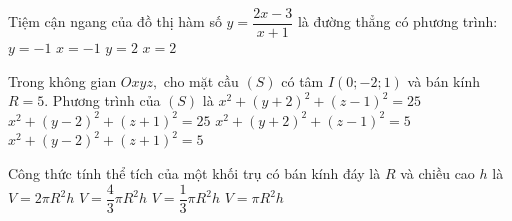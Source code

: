 \begin{ex}%
	Tiệm cận ngang của đồ thị hàm số $y=\dfrac{2x-3}{x+1}$ là đường thẳng có phương trình:
	\choice
	{$y=-1$}
	{$x=-1$}
	{\True $y=2$}
	{$x=2$}
\end{ex}

\begin{ex}%
	Trong không gian $Oxyz,$ cho mặt cầu $(S)$ có tâm $I\left(0;-2;1\right)$ và bán kính $R=5$. Phương trình của $(S)$ là
	\choice
	{\True $x^2+\left(y+2\right)^2+\left(z-1\right)^2=25$}
	{$x^2+\left(y-2\right)^2+\left(z+1\right)^2=25$}
	{$x^2+\left(y+2\right)^2+\left(z-1\right)^2=5$}
	{$x^2+\left(y-2\right)^2+\left(z+1\right)^2=5$}
\end{ex}

\begin{ex}%
	Công thức tính thể tích của một khối trụ có bán kính đáy là $R$ và chiều cao $h$ là
	\choice
	{$V=2\pi{R^2}h$}
	{$V=\dfrac{4}{3}\pi{R^2}h$}
	{$V=\dfrac{1}{3}\pi{R^2}h$}
	{\True $V=\pi{R^2}h$}
\end{ex}

